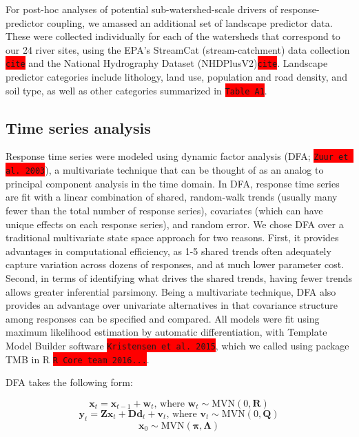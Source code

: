 \documentclass{article}
\begin{document}
For post-hoc analyses of potential sub-watershed-scale drivers of response-predictor coupling, we amassed an additional set of landscape predictor data. These were collected individually for each of the watersheds that correspond to our 24 river sites, using the EPA's StreamCat (stream-catchment) data collection \colorbox{red}{\lstinline{cite}} and the National Hydrography Dataset (NHDPlusV2)\colorbox{red}{\lstinline{cite}}. Landscape predictor categories include lithology, land use, population and road density, and soil type, as well as other categories summarized in \colorbox{red}{\lstinline{Table A1}}.

\subsection*{Time series analysis}
Response time series were modeled using dynamic factor analysis (DFA; \colorbox{red}{\lstinline{Zuur et al. 2003}}), a multivariate technique that can be thought of as an analog to principal component analysis in the time domain. In DFA, response time series are fit with a linear combination of shared, random-walk trends (usually many fewer than the total number of response series), covariates (which can have unique effects on each response series), and random error. We chose DFA over a traditional multivariate state space approach for two reasons. First, it provides advantages in computational efficiency, as 1-5 shared trends often adequately capture variation across dozens of responses, and at much lower parameter cost. Second, in terms of identifying what drives the shared trends, having fewer trends allows greater inferential parsimony. Being a multivariate technique, DFA also provides an advantage over univariate alternatives in that covariance structure among responses can be specified and compared. All models were fit using maximum likelihood estimation by automatic differentiation, with Template Model Builder software \colorbox{red}{\lstinline{Kristensen et al. 2015}}, which we called using package TMB in R \colorbox{red}{\lstinline{R Core team 2016...}}.

DFA takes the following form:

\begin{equation}
    \textbf{x}_t = \textbf{x}_{t-1} + \textbf{w}_t\textrm{, where } \textbf{w}_t \sim \textrm{MVN}(0,\textbf{R})
\end{equation}
\begin{equation}
    \textbf{y}_t = \textbf{Zx}_t + \textbf{Dd}_t + \textbf{v}_t\textrm{, where } \textbf{v}_t \sim \textrm{MVN}(0,\textbf{Q})
\end{equation}
\begin{equation}
    \textbf{x}_0 \sim \textrm{MVN}(\bm{\pi},\bm{\Lambda})
\end{equation}
\end{document}
